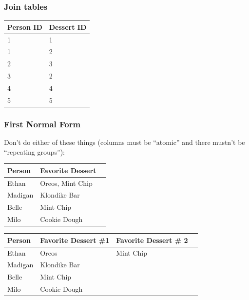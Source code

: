 \documentclass[aspectratio=169]{beamer}
\begin{document}
\begin{frame}
  \frametitle{Join tables}
  \begin{table}[]
    \footnotesize
    \begin{tabular}{@{}ll@{}}
      \toprule
      Person ID & Dessert ID \\ \midrule
      1         & 1          \\
      1         & 2          \\
      2         & 3          \\
      3         & 2          \\
      4         & 4          \\
      5         & 5          \\ \bottomrule
    \end{tabular}
  \end{table}
\end{frame}

\begin{frame}
  \frametitle{First Normal Form}

  Don't do either of these things (columns must be ``atomic'' and there
  mustn't be ``repeating groups''):

  \begin{table}[]
    \footnotesize
    \begin{tabular}{@{}lll@{}}
      \toprule
      Person  & Favorite Dessert \\ \midrule
      Ethan   & Oreos, Mint Chip \\
      Madigan & Klondike Bar     \\
      Belle   & Mint Chip        \\
      Milo    & Cookie Dough     \\ \bottomrule
    \end{tabular}
  \end{table}

  \begin{table}[]
    \footnotesize
    \begin{tabular}{@{}llll@{}}
      \toprule
      Person  & Favorite Dessert \#1 & Favorite Dessert \# 2 \\ \midrule
      Ethan   & Oreos                & Mint Chip             \\
      Madigan & Klondike Bar         &                       \\
      Belle   & Mint Chip            &                       \\
      Milo    & Cookie Dough         &                       \\ \bottomrule
    \end{tabular}
  \end{table}
\end{frame}
\end{document}
